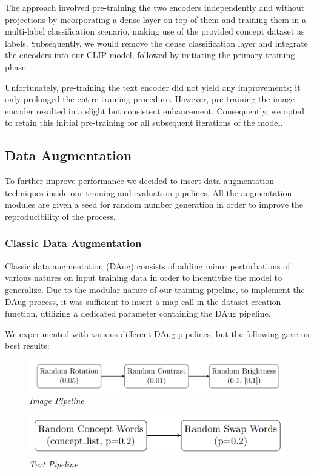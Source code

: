 \documentclass[10pt,twocolumn,letterpaper]{article}
\begin{document}
The approach involved pre-training the two encoders independently and without projections by incorporating a dense layer on top of them and training them in a multi-label classification scenario, making use of the provided concept dataset as labels. Subsequently, we would remove the dense classification layer and integrate the encoders into our CLIP model, followed by initiating the primary training phase.

Unfortunately, pre-training the text encoder did not yield any improvements; it only prolonged the entire training procedure. However, pre-training the image encoder resulted in a slight but consistent enhancement. Consequently, we opted to retain this initial pre-training for all subsequent iterations of the model.

\subsection{Data Augmentation}
To further improve performance we decided to insert data augmentation techniques inside our training and evaluation pipelines.
All the augmentation modules are given a seed for random number generation in order to improve the reproducibility of the process.

\subsubsection{Classic Data Augmentation}
Classic data augmentation (DAug) consists of adding minor perturbations of various natures on input training data in order to incentivize the model to generalize.
Due to the modular nature of our training pipeline, to implement the DAug process, it was sufficient to insert a map call in the dataset creation function, utilizing a dedicated parameter containing the DAug pipeline.

We experimented with various different DAug pipelines, but the following gave us best results:
\begin{figure}[H]
   \centering
   \includegraphics[width=1\linewidth]{img/Tikz_Daug_1.png}
   \caption{\textit{Image Pipeline}}
\end{figure}
\begin{figure}[H]
   \centering
   \includegraphics[width=0.8\linewidth]{img/Tikz_Daug_2.png}
   \caption{\textit{Text Pipeline}}
\end{figure}
\end{document}

